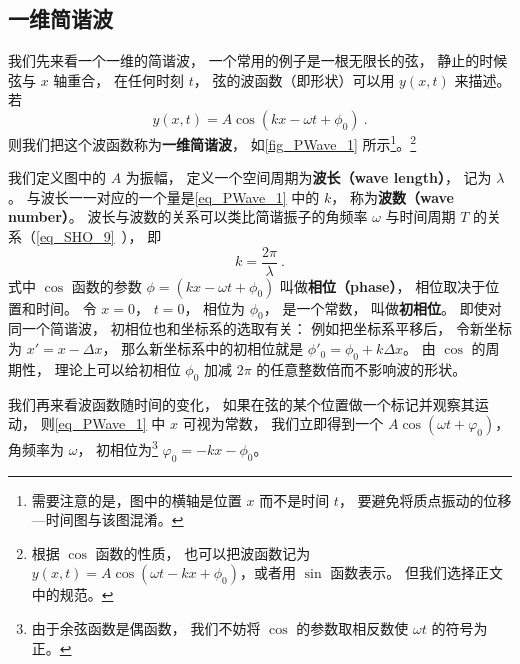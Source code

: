 \subsection{一维简谐波}
我们先来看一个一维的简谐波， 一个常用的例子是一根无限长的弦， 静止的时候弦与 $x$ 轴重合， 在任何时刻 $t$， 弦的波函数（即形状）可以用 $y(x, t)$ 来描述。 若
\begin{equation}\label{eq_PWave_1}
y(x, t) = A\cos(k x - \omega t + \phi_0)~.
\end{equation}
则我们把这个波函数称为\textbf{一维简谐波}， 如\autoref{fig_PWave_1} 所示\footnote{需要注意的是，图中的横轴是位置 $x$ 而不是时间 $t$， 要避免将质点振动的位移—时间图与该图混淆。}。\footnote{根据 $\cos$ 函数的性质， 也可以把波函数记为 $y(x, t) = A\cos(\omega t - k x + \phi_0)$，或者用 $\sin$ 函数表示。 但我们选择正文中的规范。}

我们定义图中的 $A$ 为振幅， 定义一个空间周期为\textbf{波长（wave length）}， 记为 $\lambda$。 与波长一一对应的一个量是\autoref{eq_PWave_1} 中的 $k$， 称为\textbf{波数（wave number）}。 波长与波数的关系可以类比简谐振子的角频率 $\omega$ 与时间周期 $T$ 的关系（\autoref{eq_SHO_9}~）， 即
\begin{equation}\label{eq_PWave_2}
k = \frac{2\pi}{\lambda}~.
\end{equation}
式中 $\cos$ 函数的参数 $\phi = (k x - \omega t + \phi_0)$ 叫做\textbf{相位（phase）}， 相位取决于位置和时间。 令 $x=0$， $t=0$， 相位为 $\phi_0$， 是一个常数， 叫做\textbf{初相位}。 即使对同一个简谐波， 初相位也和坐标系的选取有关： 例如把坐标系平移后， 令新坐标为 $x' = x - \Delta x$， 那么新坐标系中的初相位就是 $\phi'_0 = \phi_0 + k\Delta x$。 由 $\cos$ 的周期性， 理论上可以给初相位 $\phi_0$ 加减 $2\pi$ 的任意整数倍而不影响波的形状。

我们再来看波函数随时间的变化， 如果在弦的某个位置做一个标记并观察其运动， 则\autoref{eq_PWave_1} 中 $x$ 可视为常数， 我们立即得到一个 $A\cos(\omega t + \varphi_0)$， 角频率为 $\omega$， 初相位为\footnote{由于余弦函数是偶函数， 我们不妨将 $\cos$ 的参数取相反数使 $\omega t$ 的符号为正。} $\varphi_0 = -kx - \phi_0$。

